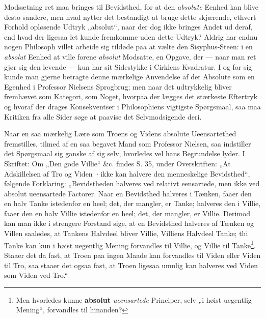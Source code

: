 \documentclass[12pt,a4paper]{book}
\newcommand{\opage}[1]{\marginnote{\footnotesize\textit{[#1]}}}
\begin{document}
\opage{45}\setcounter{footnote}{0}%
Modsætning ret maa bringes til Bevidsthed, for at den
\emph{absolute} Eenhed kan blive desto sandere, men hvad nytter
det bestandigt at bruge dette skjærende, ethvert Forhold
opløsende Udtryk „absolut“, naar der dog ikke bringes
Andet ud deraf, end hvad der ligesaa let kunde fremkomme
uden dette Udtryk? Aldrig har endnu nogen Philosoph
villet arbeide sig tildøde paa at vælte den Sisyphus-Steen:
i en \emph{absolut} Eenhed at ville forene \emph{absolut}
Modsatte, en Opgave, der --- naar man ret
gjør sig den levende --- kun har sit Sidestykke i Cirklens
Kvadratur. I og for sig kunde man gjerne betragte
denne mærkelige Anvendelse af det Absolute som
en Egenhed i Professor Nielsens Sprogbrug; men naar
det udtrykkelig bliver fremhævet som Kategori, som Noget,
hvorpaa der lægges det stærkeste Eftertryk og hvoraf der
drages Konsekventser i Philosophiens vigtigste Spørgsmaal,
saa maa Kritiken fra alle Sider søge at paavise
det Selvmodsigende deri.

Naar en saa mærkelig Lære som Troens og Videns
absolute Ueensartethed fremstilles, tilmed af en saa begavet
Mand som Professor Nielsen, saa indstiller det
Spørgsmaal sig ganske af sig selv, hvorledes vel hans
Begrundelse lyder. I Skriftet: Om „Den gode Villie“
\&c. findes S. 35, under Overskriften: „At Adskillelsen
af Tro og Viden ·ikke kan halvere den menneskelige Bevidsthed“,
følgende Forklaring: „Bevidstheden halveres
\opage{46}\setcounter{footnote}{0}%
ved relativt eensartede, men ikke ved absolut ueensartede
Factorer. Naar en Bevidsthed halveres i Tænken, faaer
den en halv Tanke istedenfor en heel; det, der mangler,
er Tanke; halveres den i Villie, faaer den en halv Villie
istedenfor en heel; det, der mangler, er Villie. Derimod
kan man ikke i strengere Forstand sige, at en Bevidsthed
halveres af Tænken og Villen saaledes, at Tankens
Halvdeel bliver Villie, Villiens Halvdeel Tanke; thi
Tanke kan kun i høist uegentlig Mening forvandles til
Villie, og Villie til Tanke\footnote{Men hvorledes kunne \textbf{absolut} \emph{ueensartede} Principer,
selv „i høist uegentlig Mening“, forvandles til hinanden?}. Staaer det da fast, at
Troen paa ingen Maade kan forvandles til Viden eller
Viden til Tro, saa staaer det ogsaa fast, at Troen ligesaa
umulig kan halveres ved Viden som Viden ved Tro.“
\end{document}
